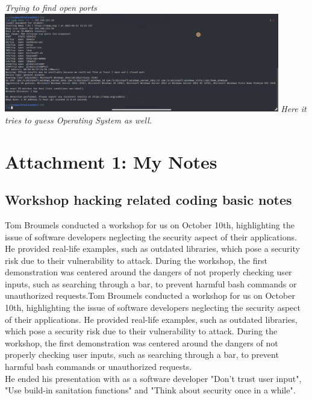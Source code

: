 \documentclass[12pt, letterpaper]{article}
\begin{document}
\break
\emph{Trying to find open ports}
\hfill\break
\hfill\break
\includegraphics[width=0.9\textwidth]{fotos/Week 5/Guessing windows nmap.jpeg}
\break
\emph{Here it tries to guess Operating System as well.}
\newpage
\section{Attachment 1: My Notes}
\subsection{Workshop hacking related coding basic notes}
\label{workshop:week1}
Tom Broumels conducted a workshop for us on October 10th, highlighting the issue of software developers neglecting the security aspect of their applications. He provided real-life examples, such as outdated libraries, which pose a security risk due to their vulnerability to attack. During the workshop, the first demonstration was centered around the dangers of not properly checking user inputs, such as searching through a bar, to prevent harmful bash commands or unauthorized requests.Tom Broumels conducted a workshop for us on October 10th, highlighting the issue of software developers neglecting the security aspect of their applications. He provided real-life examples, such as outdated libraries, which pose a security risk due to their vulnerability to attack. During the workshop, the first demonstration was centered around the dangers of not properly checking user inputs, such as searching through a bar, to prevent harmful bash commands or unauthorized requests.
\hfill\break
\\
He ended his presentation with as a software developer "Don't trust user input", "Use build-in sanitation functions" and "Think about security once in a while".


\end{document}

